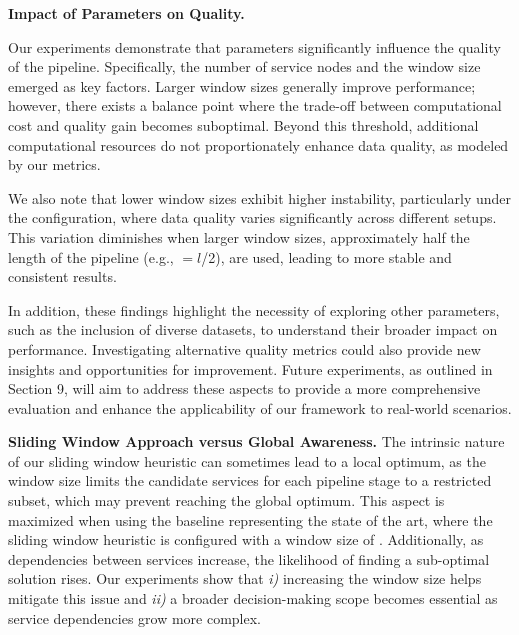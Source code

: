 \vspace{0.5em}

\noindent\textbf{Impact of Parameters on Quality.}
{\color{OurColor2}
  Our experiments demonstrate that parameters significantly influence the quality of the pipeline. Specifically, the number of service nodes and the window size emerged as key factors. Larger window sizes generally improve performance; however, there exists a balance point where the trade-off between computational cost and quality gain becomes suboptimal. Beyond this threshold, additional computational resources do not proportionately enhance data quality, as modeled by our metrics.

  We also note that lower window sizes exhibit higher instability, particularly under the \wide configuration, where data quality varies significantly across different setups. This variation diminishes when larger window sizes, approximately half the length of the pipeline (e.g., \windowsize$=$$l$/2), are used, leading to more stable and consistent results.

  In addition, these findings highlight the necessity of exploring other parameters, such as the inclusion of diverse datasets, to understand their broader impact on performance. Investigating alternative quality metrics could also provide new insights and opportunities for improvement. Future experiments, as outlined in Section 9, will aim to address these aspects to provide a more comprehensive evaluation and enhance the applicability of our framework to real-world scenarios.
}
\vspace{0.5em}

\noindent\textbf{Sliding Window Approach versus Global Awareness.} The intrinsic nature of our sliding window heuristic can sometimes lead to a local optimum, as the window size limits the candidate services for each pipeline stage to a restricted subset, which may prevent reaching the global optimum. This aspect is maximized when using the baseline representing the state of the art, where the sliding window heuristic is configured with a window size of . Additionally, as dependencies between services increase, the likelihood of finding a sub-optimal solution rises. Our experiments show that \emph{i)} increasing the window size helps mitigate this issue and \emph{ii)} a broader decision-making scope becomes essential as service dependencies grow more complex.

